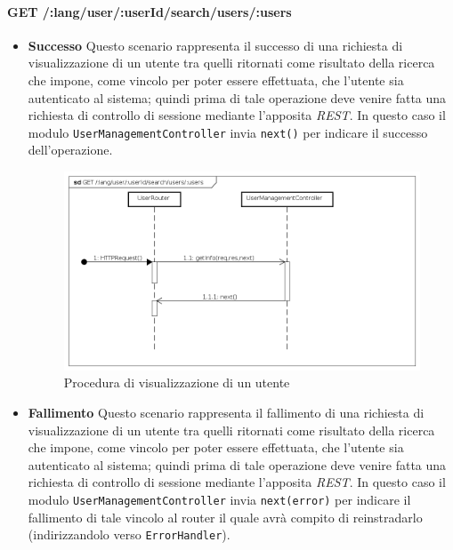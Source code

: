 \paragraph{GET /:lang/user/:userId/search/users/:users}
\begin{itemize}
\item \textbf{Successo}
Questo scenario rappresenta il successo di una richiesta di visualizzazione di un utente tra quelli ritornati come risultato della ricerca che impone, come vincolo per poter essere effettuata, che l'utente sia autenticato al sistema; quindi prima di tale operazione deve venire fatta una richiesta di controllo di sessione mediante l'apposita \textit{REST}. In questo caso il modulo \texttt{UserManagementController} invia \texttt{next()} per indicare il successo dell'operazione.

\begin{figure}[ht]
	\centering
	\includegraphics[scale=0.45]{UML/DiagrammiDiSequenza/Back-end/GET__lang_user__userId_search_users__users_success.png}
	\caption{Procedura di visualizzazione di un utente}
\end{figure}
\FloatBarrier

\item \textbf{Fallimento}
Questo scenario rappresenta il fallimento di una richiesta di visualizzazione di un utente tra quelli ritornati come risultato della ricerca che impone, come vincolo per poter essere effettuata, che l'utente sia autenticato al sistema; quindi prima di tale operazione deve venire fatta una richiesta di controllo di sessione mediante l'apposita \textit{REST}. In questo caso il modulo \texttt{UserManagementController} invia \texttt{next(error)} per indicare il fallimento di tale vincolo al router il quale avrà compito di reinstradarlo (indirizzandolo verso \texttt{ErrorHandler}).


\end{itemize}

